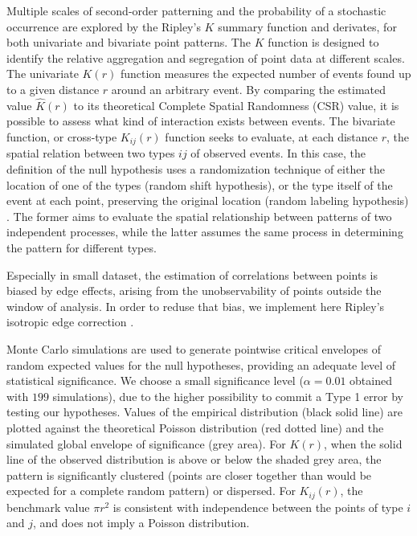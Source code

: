 \documentclass[review,authoryear]{elsarticle} %
\begin{document}
Multiple scales of second-order patterning and the probability of a stochastic occurrence are explored by the Ripley's $K$ summary function \citep{Ripley1976,Ripley1977} and derivates, for both univariate and bivariate point patterns. The $K$ function is designed to identify the relative aggregation and segregation of point data at different scales. The univariate $K(r)$ function measures the expected number of events found up to a given distance $r$ around an arbitrary event. By comparing the estimated value $\hat{K}(r)$ to its theoretical Complete Spatial Randomness (CSR) value, it is possible to assess what kind of interaction exists between events. The bivariate function, or cross-type $K_{ij}(r)$ function seeks to evaluate, at each distance $r$, the spatial relation between two types $ij$ of observed events. In this case, the definition of the null hypothesis uses a randomization technique of either the location of one of the types (random shift hypothesis), or the type itself of the event at each point, preserving the original location (random labeling hypothesis) \citep{Goreaud2003}. The former aims to evaluate the spatial relationship between patterns of two independent processes, while the latter assumes the same process in determining the pattern for different types.

Especially in small dataset, the estimation of correlations between points is biased by edge effects, arising from the unobservability of points outside the window of analysis. In order to reduse that bias, we implement here Ripley's isotropic edge correction \citep{Ripley1988,Ohser1983}.

Monte Carlo simulations \citep{Robert2004} are used to generate pointwise critical envelopes of random expected values for the null hypotheses, providing an adequate level of statistical significance. We choose a small significance level ($\alpha=0.01$ obtained with $199$ simulations), due to the higher possibility to commit a Type 1 error by testing our hypotheses. Values of the empirical distribution (black solid line) are plotted against the theoretical Poisson distribution (red dotted line) and the simulated global envelope of significance (grey area). For $K(r)$, when the solid line of the observed distribution is above or below the shaded grey area, the pattern is significantly clustered (points are closer together than would be expected for a complete random pattern) or dispersed. For $K_{ij}(r)$, the benchmark value $\pi r^2$ is consistent with independence between the points of type $i$ and $j$, and does not imply a Poisson distribution.
\end{document}
